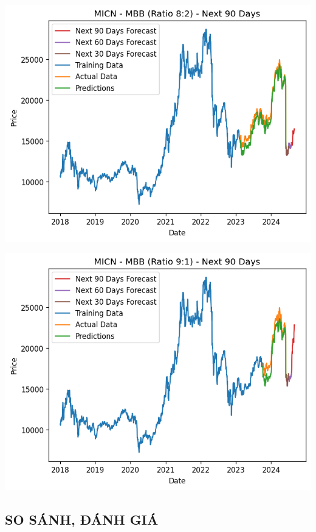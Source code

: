 \documentclass[conference]{IEEEtran}
\begin{document}
\begin{minipage}{0.21\textwidth}
    \centering
    \includegraphics[width=\linewidth]{images/MICN/MICN_MBB_82.png}
    \label{fig:image1}
\end{minipage}
\hfill
\begin{minipage}{0.21\textwidth}
    \centering
    \includegraphics[width=\linewidth]{images/MICN/MICN_MBB_91.png}
    \label{fig:image2}
\end{minipage}

\subsection{SO SÁNH, ĐÁNH GIÁ}
\end{document}
